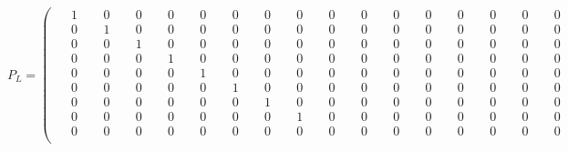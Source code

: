 \documentclass[10pt]{article}
\begin{document}
\[
P_L = \left(\begin{smallmatrix}
\phantom{-}1 & \phantom{-}0 & \phantom{-}0 & \phantom{-}0 & \phantom{-}0 & \phantom{-}0 & \phantom{-}0 & \phantom{-}0 & \phantom{-}0 & \phantom{-}0 & \phantom{-}0 & \phantom{-}0 & \phantom{-}0 & \phantom{-}0 & \phantom{-}0 & \phantom{-}0 \\
\phantom{-}0 & \phantom{-}1 & \phantom{-}0 & \phantom{-}0 & \phantom{-}0 & \phantom{-}0 & \phantom{-}0 & \phantom{-}0 & \phantom{-}0 & \phantom{-}0 & \phantom{-}0 & \phantom{-}0 & \phantom{-}0 & \phantom{-}0 & \phantom{-}0 & \phantom{-}0 \\
\phantom{-}0 & \phantom{-}0 & \phantom{-}1 & \phantom{-}0 & \phantom{-}0 & \phantom{-}0 & \phantom{-}0 & \phantom{-}0 & \phantom{-}0 & \phantom{-}0 & \phantom{-}0 & \phantom{-}0 & \phantom{-}0 & \phantom{-}0 & \phantom{-}0 & \phantom{-}0 \\
\phantom{-}0 & \phantom{-}0 & \phantom{-}0 & \phantom{-}1 & \phantom{-}0 & \phantom{-}0 & \phantom{-}0 & \phantom{-}0 & \phantom{-}0 & \phantom{-}0 & \phantom{-}0 & \phantom{-}0 & \phantom{-}0 & \phantom{-}0 & \phantom{-}0 & \phantom{-}0 \\
\phantom{-}0 & \phantom{-}0 & \phantom{-}0 & \phantom{-}0 & \phantom{-}1 & \phantom{-}0 & \phantom{-}0 & \phantom{-}0 & \phantom{-}0 & \phantom{-}0 & \phantom{-}0 & \phantom{-}0 & \phantom{-}0 & \phantom{-}0 & \phantom{-}0 & \phantom{-}0 \\
\phantom{-}0 & \phantom{-}0 & \phantom{-}0 & \phantom{-}0 & \phantom{-}0 & \phantom{-}1 & \phantom{-}0 & \phantom{-}0 & \phantom{-}0 & \phantom{-}0 & \phantom{-}0 & \phantom{-}0 & \phantom{-}0 & \phantom{-}0 & \phantom{-}0 & \phantom{-}0 \\
\phantom{-}0 & \phantom{-}0 & \phantom{-}0 & \phantom{-}0 & \phantom{-}0 & \phantom{-}0 & \phantom{-}1 & \phantom{-}0 & \phantom{-}0 & \phantom{-}0 & \phantom{-}0 & \phantom{-}0 & \phantom{-}0 & \phantom{-}0 & \phantom{-}0 & \phantom{-}0 \\
\phantom{-}0 & \phantom{-}0 & \phantom{-}0 & \phantom{-}0 & \phantom{-}0 & \phantom{-}0 & \phantom{-}0 & \phantom{-}1 & \phantom{-}0 & \phantom{-}0 & \phantom{-}0 & \phantom{-}0 & \phantom{-}0 & \phantom{-}0 & \phantom{-}0 & \phantom{-}0 \\
\phantom{-}0 & \phantom{-}0 & \phantom{-}0 & \phantom{-}0 & \phantom{-}0 & \phantom{-}0 & \phantom{-}0 & \phantom{-}0 & \phantom{-}0 & \phantom{-}0 & \phantom{-}0 & \phantom{-}0 & \phantom{-}0 & \phantom{-}0 & \phantom{-}0 & \phantom{-}0 \\

\end{smallmatrix}\]
\end{document}
